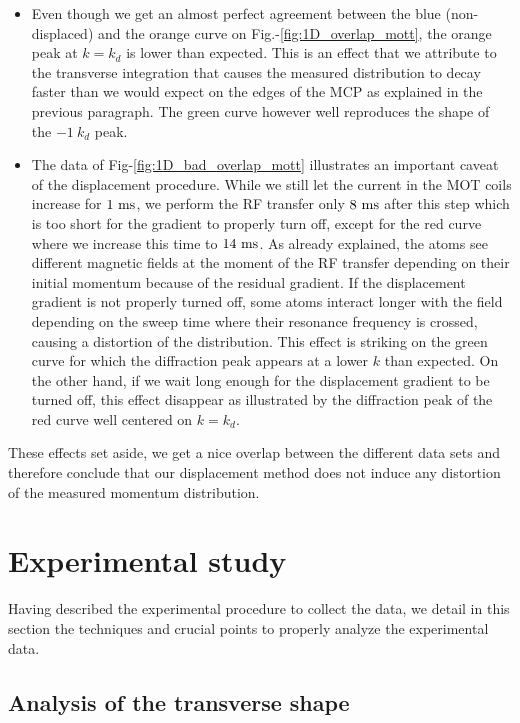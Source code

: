 \begin{itemize}
    \item Even though we get an almost perfect agreement between the blue (non-displaced) and the orange curve on Fig.-\ref{fig:1D_overlap_mott}, the orange peak at $k=k_d$ is lower than expected. This is an effect that we attribute to the transverse integration that causes the measured distribution to decay faster than we would expect on the edges of the MCP as explained in the previous paragraph. The green curve however well reproduces the shape of the $-1 \ k_d$ peak. 
    
    \item The data of Fig-\ref{fig:1D_bad_overlap_mott} illustrates an important caveat of the displacement procedure. While we still let the current in the MOT coils increase for $1 \ \rm{ms}$, we perform the RF transfer only $8 \ \rm{ms}$ after this step which is too short for the gradient to properly turn off, except for the red curve where we increase this time to $14 \ \rm{ms}$. As already explained, the atoms see different magnetic fields at the moment of the RF transfer depending on their initial momentum because of the residual gradient. If the displacement gradient is not properly turned off, some atoms interact longer with the field depending on the sweep time where their resonance frequency is crossed, causing a distortion of the distribution. This effect is striking on the green curve for which the diffraction peak appears at a lower $k$ than expected. On the other hand, if we wait long enough for the displacement gradient to be turned off, this effect disappear as illustrated by the diffraction peak of the red curve well centered on $k=k_d$.
\end{itemize}


These effects set aside, we get a nice overlap between the different data sets and therefore conclude that our displacement method does not induce any distortion of the measured momentum distribution. 

\section{Experimental study}

Having described the experimental procedure to collect the data, we detail in this section the techniques and crucial points to properly analyze the experimental data.

\subsection{Analysis of the transverse shape}

